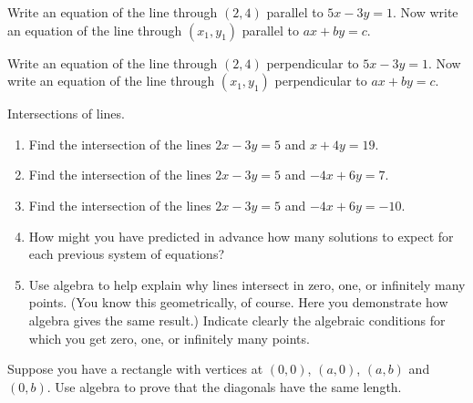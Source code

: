 \begin{prob}
Write an equation of the line through $(2,4)$ parallel to $5x-3y=1$.  
Now write an equation of the line through $(x_1,y_1)$ parallel to $ax+by=c$. 
\end{prob}

\begin{prob}
Write an equation of the line through $(2,4)$ perpendicular to $5x-3y=1$.  
Now write an equation of the line through $(x_1,y_1)$ perpendicular to $ax+by=c$. 
\end{prob}

\begin{prob}
Intersections of lines.  
\begin{enumerate}
\item Find the intersection of the lines $2x-3y=5$ and $x+4y=19$.  
\item Find the intersection of the lines $2x-3y=5$ and $-4x+6y=7$.
\item Find the intersection of the lines $2x-3y=5$ and $-4x+6y=-10$.
\item How might you have predicted in advance how many solutions to expect for each previous system of equations?
\item Use algebra to help explain why lines intersect in zero, one, or infinitely many points.  (You know this geometrically, of course.  Here you demonstrate how algebra gives the same result.)  Indicate clearly the algebraic conditions
for which you get zero, one, or infinitely many points.  
\end{enumerate}
\end{prob}

\begin{prob}
Suppose you have a rectangle with vertices at $(0,0)$, $(a,0)$,
$(a,b)$ and $(0,b)$. Use algebra to prove that the diagonals have the
same length.
\end{prob}




